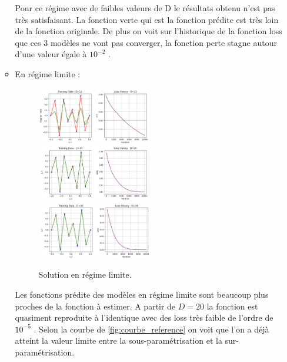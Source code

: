 \documentclass[12pt,a4paper]{article}
\begin{document}
\begin{enumerate}
\begin{itemize}
        Pour ce régime avec de faibles valeurs de D le résultats obtenu n'est pas très satisfaisant.
        La fonction verte qui est la fonction prédite est très loin de la fonction originale.
        De plus on voit sur l'historique de la fonction loss que ces 3 modèles ne vont pas converger, la fonction perte stagne autour d'une valeur égale à $10^{-2}$ .\\


        \item En régime limite :
        \begin{figure}[ht]
            \centering
            \includegraphics[width=0.5\textwidth]{src/P4.png}
            \includegraphics[width=0.5\textwidth]{src/P5.png}
            \includegraphics[width=0.5\textwidth]{src/P6.png}
            \caption{Solution en régime limite.}
            \label{fig:regime_limite}
        \end{figure}

        Les fonctions prédite des modèles en régime limite sont beaucoup plus proches de la fonction à estimer.
        A partir de $D = 20 $ la fonction est quasiment reproduite à l'identique avec des loss très faible de l'ordre de $10^{-5} $ .
        Selon la courbe de \ref{fig:courbe_reference} on voit que l'on a déjà atteint la valeur limite entre la sous-paramétrisation et la sur-paramétrisation.\\

        \newpage


\end{itemize}
\end{enumerate}
\end{document}
